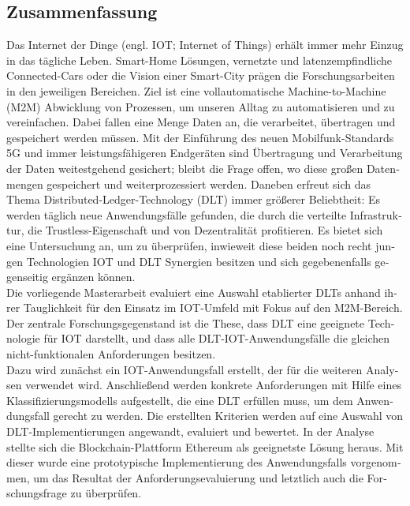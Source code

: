\begin{otherlanguage}{ngerman}
	\chapter*{Zusammenfassung}
	Das Internet der Dinge (engl. IOT; Internet of Things) erhält immer mehr Einzug in das tägliche Leben. Smart-Home Lösungen, vernetzte und latenzempfindliche Connected-Cars oder die Vision einer Smart-City prägen die Forschungsarbeiten in den jeweiligen Bereichen. Ziel ist eine vollautomatische Machine-to-Machine (M2M) Abwicklung von Prozessen, um unseren Alltag zu automatisieren und zu vereinfachen. Dabei fallen eine Menge Daten an, die verarbeitet, übertragen und gespeichert werden müssen. Mit der Einführung des neuen Mobilfunk-Standards 5G und immer leistungsfähigeren Endgeräten sind Übertragung und Verarbeitung der Daten weitestgehend gesichert; bleibt die Frage offen, wo diese großen Datenmengen gespeichert und weiterprozessiert werden.
	Daneben erfreut sich das Thema Distributed-Ledger-Technology (DLT) immer größerer Beliebtheit: Es werden täglich neue Anwendungsfälle gefunden, die durch die verteilte Infrastruktur, die Trustless-Eigenschaft und von Dezentralität profitieren. Es bietet sich eine Untersuchung an, um zu überprüfen, inwieweit diese beiden noch recht jungen Technologien IOT und DLT Synergien besitzen und sich gegebenenfalls gegenseitig ergänzen können.\\
	Die vorliegende Masterarbeit evaluiert eine Auswahl etablierter DLTs anhand ihrer Tauglichkeit für den Einsatz im IOT-Umfeld mit Fokus auf den M2M-Bereich. Der zentrale Forschungsgegenstand ist die These, dass DLT eine geeignete Technologie für IOT darstellt, und dass alle DLT-IOT-Anwendungsfälle die gleichen nicht-funktionalen Anforderungen besitzen.\\
	Dazu wird zunächst ein IOT-Anwendungsfall erstellt, der für die weiteren Analysen verwendet wird. Anschließend werden konkrete Anforderungen mit Hilfe eines Klassifizierungsmodells aufgestellt, die eine DLT erfüllen muss, um dem Anwendungsfall gerecht zu werden. Die erstellten Kriterien werden auf eine Auswahl von DLT-Implementierungen angewandt, evaluiert und bewertet. In der Analyse stellte sich die Blockchain-Plattform Ethereum als geeignetste Lösung heraus. Mit dieser wurde eine prototypische Implementierung des Anwendungsfalls vorgenommen, um das Resultat der Anforderungsevaluierung und letztlich auch die Forschungsfrage zu überprüfen.\\

\end{otherlanguage}
